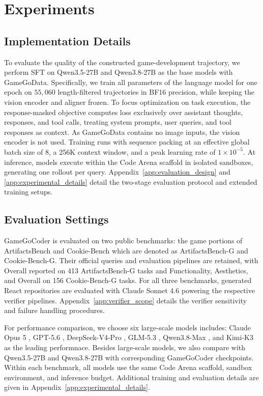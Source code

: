 \documentclass{article}
\begin{document}
\section{Experiments}
\label{sec:experiments}

\subsection{Implementation Details}
\label{sec:implementation_details}
To evaluate the quality of the constructed game-development trajectory, we perform SFT on Qwen3.5-27B \cite{qwen2026qwen35} and Qwen3.8-27B \cite{qwen2026qwen38max} as the base models with GameGoData. Specifically, we train all parameters of the language model for one epoch on $55,060$ length-filtered trajectories in BF16 precision, while keeping the vision encoder and aligner frozen. To focus optimization on task execution, the response-masked objective computes loss exclusively over assistant thoughts, responses, and tool calls, treating system prompts, user queries, and tool responses as context. As GameGoData contains no image inputs, the vision encoder is not used. Training runs with sequence packing at an effective global batch size of 8, a 256K context window, and a peak learning rate of $1 \times 10^{-5}$. At inference, models execute within the Code Arena scaffold in isolated sandboxes, generating one rollout per query. Appendix~\ref{app:evaluation_design} and \ref{app:experimental_details} detail the two-stage evaluation protocol and extended training setups.

\subsection{Evaluation Settings}
GameGoCoder is evaluated on two public benchmarks: the game portions of ArtifactsBench \cite{zhang2025artifactsbench} and Cookie-Bench \cite{yang2026cookie} which are denoted as ArtifactsBench-G and Cookie-Bench-G. Their official queries and evaluation pipelines are retained, with Overall reported on 413 ArtifactsBench-G tasks and Functionality, Aesthetics, and Overall on 156 Cookie-Bench-G tasks. For all three benchmarks, generated React repositories are evaluated with Claude Sonnet 4.6 powering the respective verifier pipelines. Appendix~\ref{app:verifier_scope} details the verifier sensitivity and failure handling procedures.

For performance comparison, we choose six large-scale models includes: Claude Opus 5 \cite{anthropic2026opus5}, GPT-5.6 \cite{openai2026gpt56}, DeepSeek-V4-Pro \cite{deepseek2026v4}, GLM-5.3 \cite{zai2026glm53}, Qwen3.8-Max \cite{qwen2026qwen38max}, and Kimi-K3 \cite{kimi2026k3} as the leading performnace. Besides large-scale models, we also compare with Qwen3.5-27B \cite{qwen2026qwen35} and Qwen3.8-27B \cite{qwen2026qwen38max} with corresponding GameGoCoder checkpoints. Within each benchmark, all models use the same Code Arena scaffold, sandbox environment, and inference budget. Additional training and evaluation details are given in Appendix~\ref{app:experimental_details}.
\end{document}
